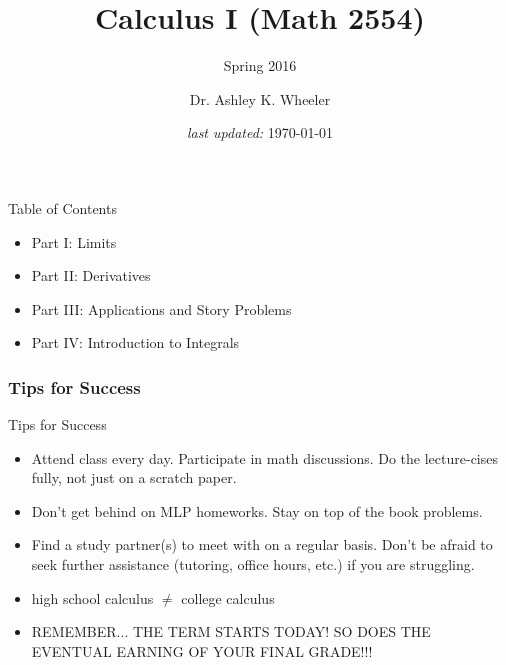 \documentclass[12pt]{beamer}
\title[Cal I Spring 2016]{Calculus I (Math 2554)}
\subtitle{Spring 2016}
\author[Wheeler]{\footnotesize Dr. Ashley K. Wheeler}
\institute{University of Arkansas}
\date{\footnotesize{\it last updated:} \today}
\theoremstyle{plain}
\theoremstyle{definition}
\begin{document}
\frame{\titlepage}

\begin{frame}[allowframebreaks]{Table of Contents}
\vspace{1pc} 
\tableofcontents[currentsection]
\vspace{-20pc}
{

	\begin{itemize}\color{red!50!black}\bf
		\item[]\hspace{-30pt}Part I: Limits
		\vspace{0.25pc}
		\item[]\hspace{-30pt}Part II: Derivatives
		\item[]\hspace{-30pt}Part III: Applications and Story Problems
		\item[]\hspace{-30pt}Part IV: Introduction to Integrals
	\end{itemize}
} %

\end{frame}

\subsubsection{Tips for Success}

\begin{frame}{Tips for Success}\footnotesize
\begin{itemize}
\item Attend class every day.  \alert{Participate} in math discussions.  Do the lecture-cises fully, not just on a scratch paper.  
\item Don't get behind on MLP homeworks.  Stay on top of the book problems.
\item Find a study partner(s) to meet with on a regular basis.  Don't be afraid to seek further assistance (tutoring, office hours, etc.) if you are struggling.
\item high school calculus $\neq$ college calculus
\item REMEMBER... THE TERM STARTS TODAY!  SO DOES THE EVENTUAL EARNING OF YOUR FINAL GRADE!!!
\end{itemize}
\end{frame}
\end{document}
